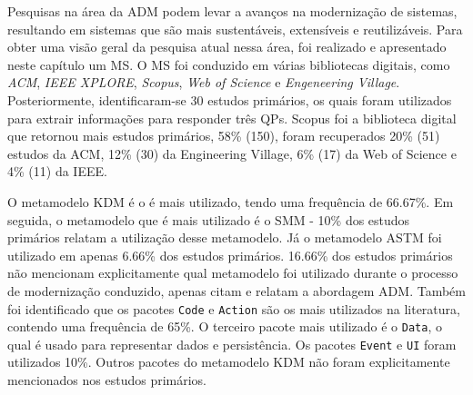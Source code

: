 Pesquisas na área da ADM podem levar a avanços na modernização de sistemas, resultando em sistemas que são mais sustentáveis, extensíveis e reutilizáveis. Para obter uma visão geral da pesquisa atual nessa área, foi realizado e apresentado neste capítulo um MS. O MS foi conduzido em várias bibliotecas digitais, como \textit{ACM}, \textit{IEEE XPLORE}, \textit{Scopus}, \textit{Web of Science} e \textit{Engeneering Village}. Posteriormente, identificaram-se 30 estudos primários, os quais foram utilizados para extrair informações para responder três QPs. Scopus foi a biblioteca digital que retornou mais estudos primários, 58\% (150), foram recuperados 20\% (51) estudos da ACM, 12\% (30) da Engineering Village, 6\% (17) da Web of Science e 4\% (11) da IEEE. 

O metamodelo KDM é o é mais utilizado, tendo uma frequência de 66.67\%. Em seguida, o metamodelo que é mais utilizado é o SMM - 10\% dos estudos primários relatam a utilização desse metamodelo. Já o metamodelo ASTM foi utilizado em apenas 6.66\% dos estudos primários. 16.66\% dos estudos primários não mencionam explicitamente qual metamodelo foi utilizado durante o processo de modernização conduzido, apenas citam e relatam a abordagem ADM. Também foi identificado que os pacotes \texttt{Code} e \texttt{Action} são os mais utilizados na literatura, contendo uma frequência de 65\%. O terceiro pacote mais utilizado é o \texttt{Data}, o qual é usado para representar dados e persistência. Os pacotes \texttt{Event} e \texttt{UI} foram utilizados 10\%. Outros pacotes do metamodelo KDM não foram explicitamente mencionados nos estudos primários.

